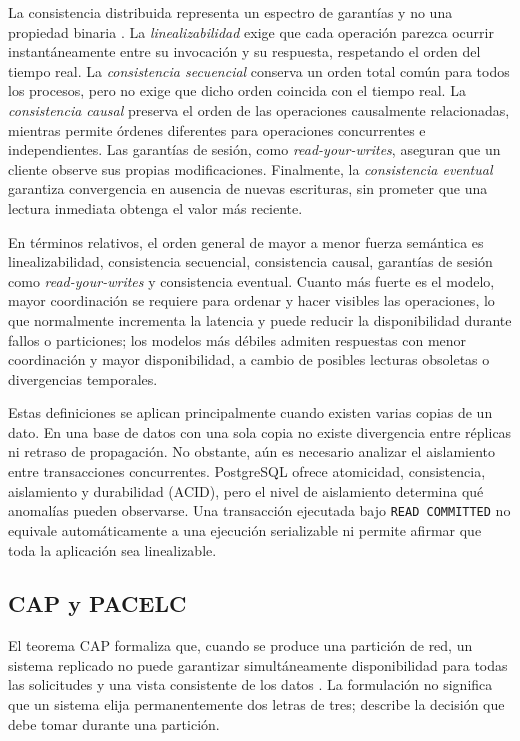 \documentclass[11pt,a4paper]{article}
\begin{document}
La consistencia distribuida representa un espectro de garantías y no una propiedad binaria \cite{ahmed2023tradeoffs}. La \emph{linealizabilidad} exige que cada operación parezca ocurrir instantáneamente entre su invocación y su respuesta, respetando el orden del tiempo real. La \emph{consistencia secuencial} conserva un orden total común para todos los procesos, pero no exige que dicho orden coincida con el tiempo real. La \emph{consistencia causal} preserva el orden de las operaciones causalmente relacionadas, mientras permite órdenes diferentes para operaciones concurrentes e independientes. Las garantías de sesión, como \emph{read-your-writes}, aseguran que un cliente observe sus propias modificaciones. Finalmente, la \emph{consistencia eventual} garantiza convergencia en ausencia de nuevas escrituras, sin prometer que una lectura inmediata obtenga el valor más reciente.

En términos relativos, el orden general de mayor a menor fuerza semántica es linealizabilidad, consistencia secuencial, consistencia causal, garantías de sesión como \emph{read-your-writes} y consistencia eventual. Cuanto más fuerte es el modelo, mayor coordinación se requiere para ordenar y hacer visibles las operaciones, lo que normalmente incrementa la latencia y puede reducir la disponibilidad durante fallos o particiones; los modelos más débiles admiten respuestas con menor coordinación y mayor disponibilidad, a cambio de posibles lecturas obsoletas o divergencias temporales.

Estas definiciones se aplican principalmente cuando existen varias copias de un dato. En una base de datos con una sola copia no existe divergencia entre réplicas ni retraso de propagación. No obstante, aún es necesario analizar el aislamiento entre transacciones concurrentes. PostgreSQL ofrece atomicidad, consistencia, aislamiento y durabilidad (ACID), pero el nivel de aislamiento determina qué anomalías pueden observarse. Una transacción ejecutada bajo \texttt{READ COMMITTED} no equivale automáticamente a una ejecución serializable ni permite afirmar que toda la aplicación sea linealizable.

\subsection{CAP y PACELC}

El teorema CAP formaliza que, cuando se produce una partición de red, un sistema replicado no puede garantizar simultáneamente disponibilidad para todas las solicitudes y una vista consistente de los datos \cite{ahmed2023tradeoffs}. La formulación no significa que un sistema elija permanentemente dos letras de tres; describe la decisión que debe tomar durante una partición.
\end{document}
